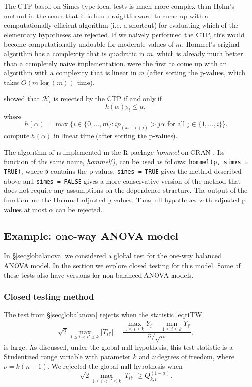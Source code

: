 \documentclass[11pt]{article}
\theoremstyle{plain}
\theoremstyle{definition}
\newcommand{\Hy}{\mathcal{H}}
\newcommand{\citt}{\citet}
\newcommand{\citp}{\citep}
\begin{document}
The CTP based on Simes-type local tests is much more complex than Holm's method in the sense that it is less straightforward to come up with a computationally efficient algorithm (i.e. a shortcut) for evaluating which of the elementary hypotheses are rejected. 
If we naively performed the CTP, this would become computationally undoable for moderate values of $m$.
Hommel's original algorithm has a complexity that is quadratic in $m$, which is already much better than a completely naive implementation.  \citt{meijer2019hommel} were the first to come up with an algorithm with a complexity that is linear in $m$ (after sorting the p-values, which takes $O(m\log(m))$ time). 

\citt{hommel1988stagewise} showed that $\Hy_i$ is rejected by the CTP if and only if
$$h(\alpha)p_i\leq \alpha,$$
where 
$$ h(\alpha) = \max\big\{i\in\{0,...,m\}:  i p_{(m-i+j)}> j\alpha \text{ for all } j\in\{1,...,i\}\big\} .$$  
\citt{meijer2019hommel} compute  $h(\alpha)$ in linear time (after sorting the p-values).

The algorithm of  \citt{meijer2019hommel}  is implemented in the R package \emph{hommel} on CRAN \citp{hommel}. Its function of the same name, \emph{hommel()},  can be used as follows:
\verb|hommel(p, simes = TRUE)|, where \verb|p| contains the p-values. \verb|simes = TRUE| gives the method described above and \verb|simes = FALSE| gives a more conservative version of the method that does not require any assumptions on the dependence structure. The output of the function are the Hommel-adjusted p-values. Thus, all hypotheses with adjusted p-values at most $\alpha$ can be rejected.




\subsection{Example: one-way ANOVA model} \label{secANOVA-CT}
In \S\ref{secglobalanova} we considered a global test for the one-way balanced ANOVA model. In the section we explore closed testing for  this model. Some of these tests also have versions for non-balanced ANOVA models.

\subsubsection{Closed testing  method}
The test from \S\ref{secglobalanova} rejects when the statistic \eqref{eqttTW},
$$ \sqrt{2}\max_{1\leq i < i'\leq k} |T_{ii'}| =\frac{\max_{1\leq i \leq k} \bar{Y}_i- \min_{1\leq i \leq k}\bar{Y}_{i'}}{\hat{\sigma}/\sqrt{n}},$$
 is large. %
As discussed, under the global null hypothesis, this test statistic is a Studentized range variable with parameter $k$ and $\nu$ degrees of freedom, where $\nu=k(n-1)$.
We rejected the global null hypothesis when 
$$   \sqrt{2}\max_{1\leq i < i'\leq k} |T_{ii'}| \geq Q_{k,\nu}^{(1-\alpha)}.$$
\end{document}
